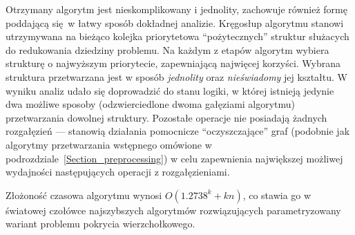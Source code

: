 \par {
  Otrzymany algorytm jest nieskomplikowany i jednolity, zachowuje również formę poddającą się w łatwy sposób dokładnej analizie.
  Kręgosłup algorytmu stanowi utrzymywana na bieżąco kolejka priorytetowa ``pożytecznych'' struktur służacych do redukowania dziedziny problemu.
  Na każdym z etapów algorytm wybiera strukturę o najwyższym priorytecie, zapewniającą najwięcej korzyści.
  Wybrana struktura przetwarzana jest w sposób \emph{jednolity} oraz \emph{nieświadomy} jej kształtu.
  W wyniku analiz udało się doprowadzić do stanu logiki, w której istnieją jedynie dwa możliwe sposoby (odzwierciedlone dwoma gałęziami algorytmu) przetwarzania dowolnej struktury.
  Pozostałe operacje nie posiadają żadnych rozgałęzień --- stanowią działania pomocnicze ``oczyszczające'' graf (podobnie jak algorytmy przetwarzania wstępnego omówione w podrozdziale~\ref{Section_preprocessing}) w celu zapewnienia największej możliwej wydajności następujących operacji z rozgałęzieniami.

  Złożoność czasowa algorytmu wynosi $O(1.2738^k + kn)$, co stawia go w światowej czołówce najszybszych algorytmów rozwiązujących parametryzowany wariant problemu pokrycia wierzchołkowego.
}

